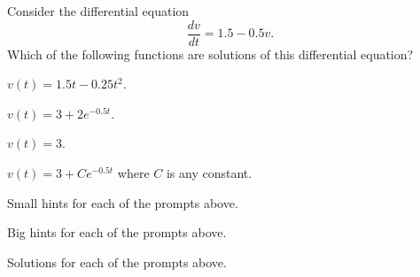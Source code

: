\begin{activity} \label{A:7.1.3}  Consider the differential equation 
$$
\frac{dv}{dt} = 1.5 - 0.5v.
$$
Which of the following functions are solutions of this differential equation?
\ba
	\item $v(t) = 1.5t - 0.25t^2$.
        \item $v(t) = 3 + 2e^{-0.5t}$.
        \item $v(t) = 3$.
        \item $v(t) = 3 + Ce^{-0.5t}$ where $C$ is any constant.
\ea
\end{activity}
\begin{smallhint}
\ba
	\item Small hints for each of the prompts above.
\ea
\end{smallhint}
\begin{bighint}
\ba
	\item Big hints for each of the prompts above.
\ea
\end{bighint}
\begin{activitySolution}
\ba
	\item Solutions for each of the prompts above.
\ea
\end{activitySolution}
\aftera